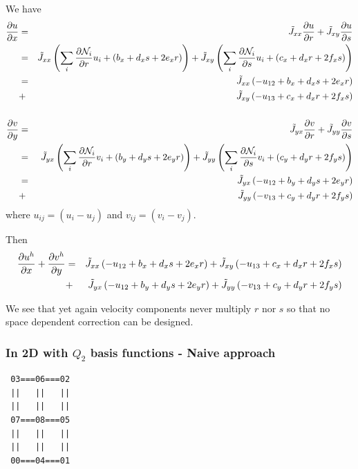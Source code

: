 We have
\begin{eqnarray}
\frac{\partial u}{\partial x} 
&=& \tilde{J}_{xx} \frac{\partial u}{\partial r} +  \tilde{J}_{xy} \frac{\partial u}{\partial s}  \nonumber\\
&=& \tilde{J}_{xx} \left( \sum_i \frac{\partial {\mathcal{N}}_i}{\partial r} u_i + (b_x + d_xs + 2e_xr )  \right) 
 +  \tilde{J}_{xy} \left( \sum_i \frac{\partial {\mathcal{N}}_i}{\partial s} u_i + (c_x + d_xr + 2f_xs )  \right)  \nonumber\\
&=& \tilde{J}_{xx} \left( - u_{12} + b_x + d_xs + 2e_xr \right) \nonumber\\ 
&+& \tilde{J}_{xy} \left( - u_{13} + c_x + d_xr + 2f_xs \right) \nonumber\\ 
\nonumber\\
\frac{\partial v}{\partial y} 
&=& \tilde{J}_{yx} \frac{\partial v}{\partial r} +  \tilde{J}_{yy} \frac{\partial v}{\partial s} \nonumber\\
&=& \tilde{J}_{yx} \left(  \sum_i \frac{\partial {\mathcal{N}}_i}{\partial r} v_i + (b_y + d_ys + 2e_yr ) \right)  
+  \tilde{J}_{yy} \left( \sum_i \frac{\partial {\mathcal{N}}_i}{\partial s} v_i + (c_y + d_yr + 2f_ys ) \right) \nonumber\\
&=& \tilde{J}_{yx} \left( -u_{12} + b_y + d_ys + 2e_yr  \right)  \nonumber\\
&+& \tilde{J}_{yy} \left( -v_{13} + c_y + d_yr + 2f_ys  \right) \nonumber
\end{eqnarray}
where $u_{ij}=(u_i-u_j)$ and $v_{ij}=(v_i-v_j)$.

Then 
\begin{eqnarray}
\frac{\partial u^h}{\partial x}
+
\frac{\partial v^h}{\partial y}
&=& \tilde{J}_{xx} \left( - u_{12} + b_x + d_xs + 2e_xr \right) 
+ \tilde{J}_{xy} \left( - u_{13} + c_x + d_xr + 2f_xs \right) \nonumber\\
&+& \tilde{J}_{yx} \left( -u_{12} + b_y + d_ys + 2e_yr  \right) 
+ \tilde{J}_{yy} \left( -v_{13} + c_y + d_yr + 2f_ys  \right) \nonumber
\end{eqnarray}

We see that yet again velocity components never multiply $r$ nor $s$ so that 
no space dependent correction can be designed. 



\subsubsection{In 2D with $Q_2$ basis functions - Naive approach}

\begin{verbatim}
 03===06===02  
 ||   ||   ||  
 ||   ||   ||  
 07===08===05  
 ||   ||   ||  
 ||   ||   ||  
 00===04===01  
\end{verbatim}

